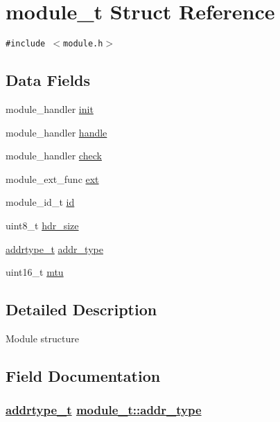 \hypertarget{structmodule__t}{
\section{module\_\-t Struct Reference}
\label{structmodule__t}
}
{\tt \#include $<$module.h$>$}

\subsection*{Data Fields}
\begin{CompactItemize}
\item 
module\_\-handler \hyperlink{structmodule__t_44cda748f1cc718519c176a1c93cf6e4}{init}
\item 
module\_\-handler \hyperlink{structmodule__t_2508e1e27ce2fbddbfb5aefcd5406bfb}{handle}
\item 
module\_\-handler \hyperlink{structmodule__t_ec8448cc809c87a4e86ed8534c3300af}{check}
\item 
module\_\-ext\_\-func \hyperlink{structmodule__t_04a569e519ee33f1391361047922fd2b}{ext}
\item 
module\_\-id\_\-t \hyperlink{structmodule__t_adfde6094c8c16eeeea923ddb5a958db}{id}
\item 
uint8\_\-t \hyperlink{structmodule__t_7641f6a11d4b3c82e2fc045b9c3cf0aa}{hdr\_\-size}
\item 
\hyperlink{address_8h_faf76b5591da0abd0584dec411d0551d}{addrtype\_\-t} \hyperlink{structmodule__t_887ec8c859dcc146253dcd16afffda53}{addr\_\-type}
\item 
uint16\_\-t \hyperlink{structmodule__t_f6fc529e7214ed8ba022da36b7e414a1}{mtu}
\end{CompactItemize}


\subsection{Detailed Description}
Module structure 



\subsection{Field Documentation}
\hypertarget{structmodule__t_887ec8c859dcc146253dcd16afffda53}{
\subsubsection[addr\_\-type]{\setlength{\rightskip}{0pt plus 5cm}\hyperlink{address_8h_faf76b5591da0abd0584dec411d0551d}{addrtype\_\-t} \hyperlink{structmodule__t_887ec8c859dcc146253dcd16afffda53}{module\_\-t::addr\_\-type}}}
\label{structmodule__t_887ec8c859dcc146253dcd16afffda53}


